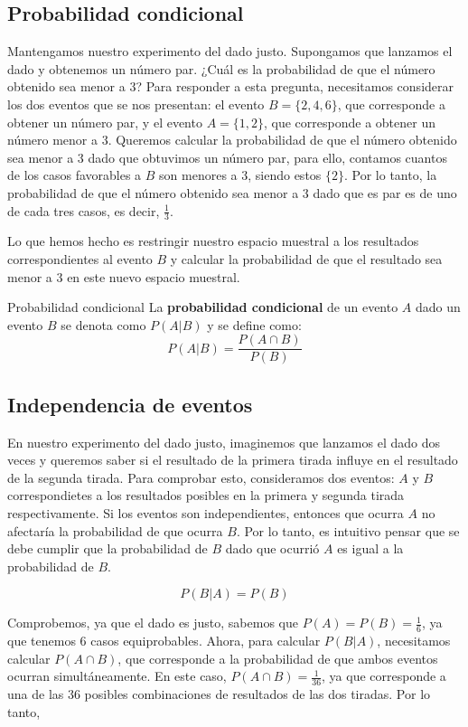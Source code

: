 \subsection{Probabilidad condicional}

Mantengamos nuestro experimento del dado justo. Supongamos que lanzamos el dado y obtenemos un número par.
¿Cuál es la probabilidad de que el número obtenido sea menor a 3? Para responder a esta pregunta, necesitamos considerar
los dos eventos que se nos presentan: el evento $B = \{2,4,6\}$, que corresponde a obtener un número par, y el evento $A = \{1,2\}$,
que corresponde a obtener un número menor a 3. Queremos calcular la probabilidad de que el número obtenido sea menor a 3 dado que
obtuvimos un número par, para ello, contamos cuantos de los casos favorables a $B$ son menores a 3, siendo estos $\{2\}$. Por lo tanto,
la probabilidad de que el número obtenido sea menor a 3 dado que es par es de uno de cada tres casos, es decir, $\frac{1}{3}$.

Lo que hemos hecho es restringir nuestro espacio muestral a los resultados correspondientes al evento $B$ y
calcular la probabilidad de que el resultado sea menor a 3 en este nuevo espacio muestral.

\begin{definicion}{Probabilidad condicional}
  La \textbf{probabilidad condicional} de un evento $A$ dado un evento $B$ se denota como $P(A|B)$ y se define como:
  \[
    P(A|B) = \frac{P(A \cap B)}{P(B)}
  \]
\end{definicion}

\subsection{Independencia de eventos}

En nuestro experimento del dado justo, imaginemos que lanzamos el dado dos veces y queremos saber si el resultado de la primera tirada
influye en el resultado de la segunda tirada. Para comprobar esto, consideramos dos eventos: $A$ y $B$ correspondietes
a los resultados posibles en la primera y segunda tirada respectivamente. Si los eventos son independientes, entonces que ocurra $A$ no
afectaría la probabilidad de que ocurra $B$. Por lo tanto, es intuitivo pensar que se debe cumplir que la probabilidad de $B$ dado que
ocurrió $A$ es igual a la probabilidad de $B$.

$$
P(B|A) = P(B)
$$

Comprobemos, ya que el dado es justo, sabemos que $P(A) = P(B) = \frac{1}{6}$, ya que tenemos 6 casos equiprobables. Ahora, para calcular
$P(B|A)$, necesitamos calcular $P(A \cap B)$, que corresponde a la probabilidad de que ambos eventos ocurran simultáneamente. En este caso,
$P(A \cap B) = \frac{1}{36}$, ya que corresponde a una de las 36 posibles combinaciones de resultados de las dos tiradas. Por lo tanto,

